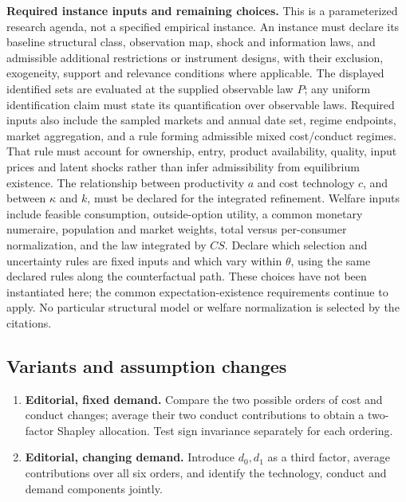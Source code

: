 \documentclass[11pt,a4paper]{article}
\begin{document}
\textbf{Required instance inputs and remaining choices.} This is a parameterized research agenda, not a specified empirical instance. An instance must declare its baseline structural class, observation map, shock and information laws, and admissible additional restrictions or instrument designs, with their exclusion, exogeneity, support and relevance conditions where applicable. The displayed identified sets are evaluated at the supplied observable law \(P\); any uniform identification claim must state its quantification over observable laws. Required inputs also include the sampled markets and annual date set, regime endpoints, market aggregation, and a rule forming admissible mixed cost/conduct regimes. That rule must account for ownership, entry, product availability, quality, input prices and latent shocks rather than infer admissibility from equilibrium existence. The relationship between productivity \(a\) and cost technology \(c\), and between \(\kappa\) and \(k\), must be declared for the integrated refinement. Welfare inputs include feasible consumption, outside-option utility, a common monetary numeraire, population and market weights, total versus per-consumer normalization, and the law integrated by \(CS\). Declare which selection and uncertainty rules are fixed inputs and which vary within \(\theta\), using the same declared rules along the counterfactual path. These choices have not been instantiated here; the common expectation-existence requirements continue to apply. No particular structural model or welfare normalization is selected by the citations.
\subsection*{Variants and assumption changes}
\begin{enumerate}
\item \textbf{Editorial, fixed demand.} Compare the two possible orders of cost and conduct changes; average their two conduct contributions to obtain a two-factor Shapley allocation. Test sign invariance separately for each ordering.
\item \textbf{Editorial, changing demand.} Introduce \(d_0,d_1\) as a third factor, average contributions over all six orders, and identify the technology, conduct and demand components jointly.
\end{enumerate}
\end{document}
